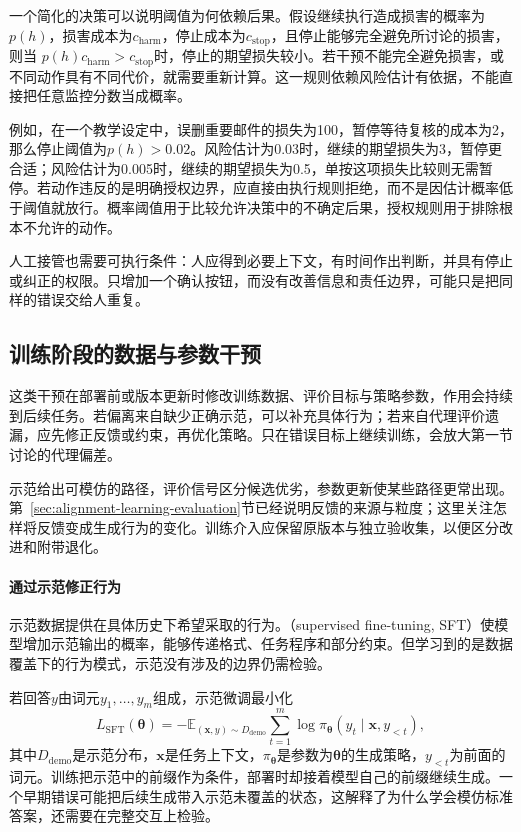 一个简化的决策可以说明阈值为何依赖后果。假设继续执行造成损害的概率为$p(h)$，损害成本为$c_{\mathrm{harm}}$，停止成本为$c_{\mathrm{stop}}$，且停止能够完全避免所讨论的损害，则当
$p(h)c_{\mathrm{harm}}>c_{\mathrm{stop}}$时，停止的期望损失较小。若干预不能完全避免损害，或不同动作具有不同代价，就需要重新计算。这一规则依赖风险估计有依据，不能直接把任意监控分数当成概率。

例如，在一个教学设定中，误删重要邮件的损失为100，暂停等待复核的成本为2，那么停止阈值为$p(h)>0.02$。风险估计为0.03时，继续的期望损失为3，暂停更合适；风险估计为0.005时，继续的期望损失为0.5，单按这项损失比较则无需暂停。若动作违反的是明确授权边界，应直接由执行规则拒绝，而不是因估计概率低于阈值就放行。概率阈值用于比较允许决策中的不确定后果，授权规则用于排除根本不允许的动作。

人工接管也需要可执行条件：人应得到必要上下文，有时间作出判断，并具有停止或纠正的权限。只增加一个确认按钮，而没有改善信息和责任边界，可能只是把同样的错误交给人重复。

\subsection{训练阶段的数据与参数干预}
\label{sec:alignment-learning}
\label{sec:alignment-learning-demonstration}
\label{sec:alignment-learning-policy}

这类干预在部署前或版本更新时修改训练数据、评价目标与策略参数，作用会持续到后续任务。若偏离来自缺少正确示范，可以补充具体行为；若来自代理评价遗漏，应先修正反馈或约束，再优化策略。只在错误目标上继续训练，会放大第一节讨论的代理偏差。

示范给出可模仿的路径，评价信号区分候选优劣，参数更新使某些路径更常出现。第~\ref{sec:alignment-learning-evaluation}节已经说明反馈的来源与粒度；这里关注怎样将反馈变成生成行为的变化。训练介入应保留原版本与独立验收集，以便区分改进和附带退化。

\paragraph{通过示范修正行为}

示范数据提供在具体历史下希望采取的行为。（supervised fine-tuning, SFT）使模型增加示范输出的概率，能够传递格式、任务程序和部分约束。但学习到的是数据覆盖下的行为模式，示范没有涉及的边界仍需检验。

若回答$y$由词元$y_1,\ldots,y_m$组成，示范微调最小化
\begin{equation}
 L_{\mathrm{SFT}}(\bm{\theta})
 =-\mathbb E_{(\bm{x},y)\sim D_{\mathrm{demo}}}
   \sum_{t=1}^{m}\log\pi_{\bm{\theta}}
          (y_t\mid\bm{x},y_{<t}),
 \label{eq:alignment-sft}
\end{equation}
其中$D_{\mathrm{demo}}$是示范分布，$\bm{x}$是任务上下文，$\pi_{\bm{\theta}}$是参数为$\bm{\theta}$的生成策略，$y_{<t}$为前面的词元。训练把示范中的前缀作为条件，部署时却接着模型自己的前缀继续生成。一个早期错误可能把后续生成带入示范未覆盖的状态，这解释了为什么学会模仿标准答案，还需要在完整交互上检验。

